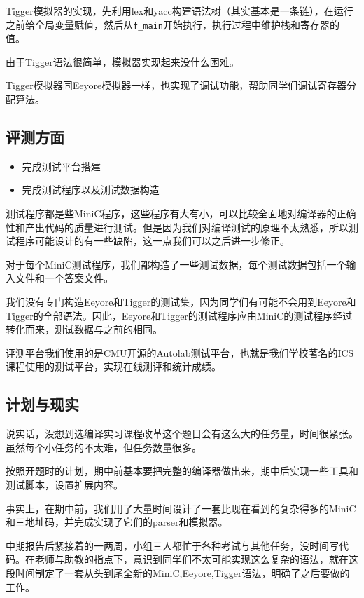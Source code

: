 \documentclass[a4paper]{ctexart}
\begin{document}
Tigger模拟器的实现，先利用lex和yacc构建语法树（其实基本是一条链），在运行之前给全局变量赋值，然后从\texttt{f\_main}开始执行，执行过程中维护栈和寄存器的值。

由于Tigger语法很简单，模拟器实现起来没什么困难。

Tigger模拟器同Eeyore模拟器一样，也实现了调试功能，帮助同学们调试寄存器分配算法。
\\

\subsection{评测方面}
\begin{itemize}
	\item 完成测试平台搭建
	\item 完成测试程序以及测试数据构造
\end{itemize}

测试程序都是些MiniC程序，这些程序有大有小，可以比较全面地对编译器的正确性和产出代码的质量进行测试。但是因为我们对编译测试的原理不太熟悉，所以测试程序可能设计的有一些缺陷，这一点我们可以之后进一步修正。

对于每个MiniC测试程序，我们都构造了一些测试数据，每个测试数据包括一个输入文件和一个答案文件。

我们没有专门构造Eeyore和Tigger的测试集，因为同学们有可能不会用到Eeyore和Tigger的全部语法。因此，Eeyore和Tigger的测试程序应由MiniC的测试程序经过转化而来，测试数据与之前的相同。

评测平台我们使用的是CMU开源的Autolab测试平台，也就是我们学校著名的ICS课程使用的测试平台，实现在线测评和统计成绩。

\subsection{计划与现实}

说实话，没想到选编译实习课程改革这个题目会有这么大的任务量，时间很紧张。虽然每个小任务的不太难，但任务数量很多。

按照开题时的计划，期中前基本要把完整的编译器做出来，期中后实现一些工具和测试脚本，设置扩展内容。

事实上，在期中前，我们用了大量时间设计了一套比现在看到的复杂得多的MiniC和三地址码，并完成实现了它们的parser和模拟器。

中期报告后紧接着的一两周，小组三人都忙于各种考试与其他任务，没时间写代码。在老师与助教的指点下，意识到同学们不太可能实现这么复杂的语法，就在这段时间制定了一套从头到尾全新的MiniC,Eeyore,Tigger语法，明确了之后要做的工作。
\end{document}
